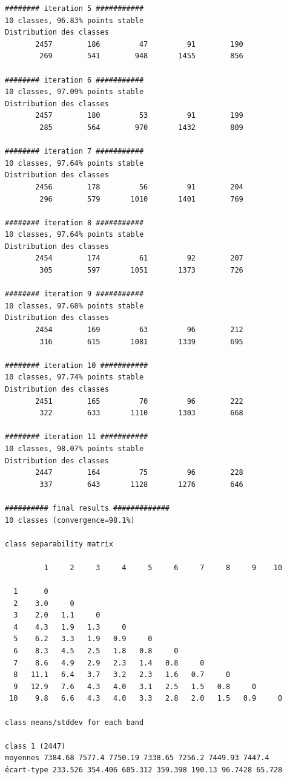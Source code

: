 \documentclass[earth,article,submit,pdftex,moreauthors]{Definitions/mdpi}
\begin{document}
\begin{scriptsize}
\begin{verbatim}
######## iteration 5 ###########
10 classes, 96.83% points stable
Distribution des classes
       2457        186         47         91        190
        269        541        948       1455        856

######## iteration 6 ###########
10 classes, 97.09% points stable
Distribution des classes
       2457        180         53         91        199
        285        564        970       1432        809

######## iteration 7 ###########
10 classes, 97.64% points stable
Distribution des classes
       2456        178         56         91        204
        296        579       1010       1401        769

######## iteration 8 ###########
10 classes, 97.64% points stable
Distribution des classes
       2454        174         61         92        207
        305        597       1051       1373        726

######## iteration 9 ###########
10 classes, 97.68% points stable
Distribution des classes
       2454        169         63         96        212
        316        615       1081       1339        695

######## iteration 10 ###########
10 classes, 97.74% points stable
Distribution des classes
       2451        165         70         96        222
        322        633       1110       1303        668

######## iteration 11 ###########
10 classes, 98.07% points stable
Distribution des classes
       2447        164         75         96        228
        337        643       1128       1276        646

########## final results #############
10 classes (convergence=98.1%)

class separability matrix

         1     2     3     4     5     6     7     8     9    10

  1      0
  2    3.0     0
  3    2.0   1.1     0
  4    4.3   1.9   1.3     0
  5    6.2   3.3   1.9   0.9     0
  6    8.3   4.5   2.5   1.8   0.8     0
  7    8.6   4.9   2.9   2.3   1.4   0.8     0
  8   11.1   6.4   3.7   3.2   2.3   1.6   0.7     0
  9   12.9   7.6   4.3   4.0   3.1   2.5   1.5   0.8     0
 10    9.8   6.6   4.3   4.0   3.3   2.8   2.0   1.5   0.9     0

class means/stddev for each band

class 1 (2447)
moyennes 7384.68 7577.4 7750.19 7338.65 7256.2 7449.93 7447.4
écart-type 233.526 354.406 605.312 359.398 190.13 96.7428 65.728


\end{verbatim}
\end{scriptsize}
\end{document}
